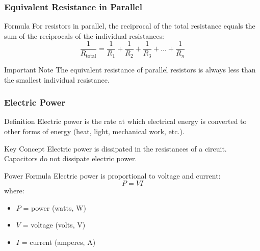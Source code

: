 \documentclass{beamer}
\begin{document}
\begin{frame}
    \frametitle{Equivalent Resistance in Parallel}
    \begin{block}{Formula}
        For resistors in parallel, the reciprocal of the total resistance equals the sum of the reciprocals of the individual resistances:
        \begin{equation}
            \frac{1}{R_{\text{total}}} = \frac{1}{R_1} + \frac{1}{R_2} + \frac{1}{R_3} + \ldots + \frac{1}{R_n}
        \end{equation}
    \end{block}
    
   
    \begin{block}{Important Note}
        The equivalent resistance of parallel resistors is always less than the smallest individual resistance.
    \end{block}
\end{frame}

\begin{frame}
    \frametitle{Electric Power}
    \begin{block}{Definition}
        Electric power is the rate at which electrical energy is converted to other forms of energy (heat, light, mechanical work, etc.).
    \end{block}
    
    \begin{block}{Key Concept}
        Electric power is dissipated in the resistances of a circuit. Capacitors do not dissipate electric power.
    \end{block}
    
    \begin{block}{Power Formula}
        Electric power is proportional to voltage and current:
        \begin{equation}
            P = VI
        \end{equation}
        where:
        \begin{itemize}
            \item $P$ = power (watts, W)
            \item $V$ = voltage (volts, V)
            \item $I$ = current (amperes, A)
        \end{itemize}
    \end{block}
\end{frame}
\end{document}

